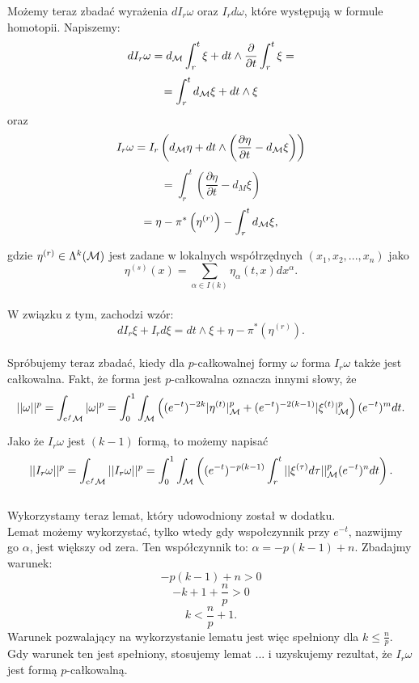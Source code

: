 \documentclass[licencjacka]{pracamgr}
\theoremstyle{definition}
\theoremstyle{definition}
\theoremstyle{plain}
\theoremstyle{plain}
\def\cfm{\ensuremath\mathrm{c}^f\mathcal{M}}
\def\M{\ensuremath\mathcal{M}}
\begin{document}
Możemy teraz zbadać wyrażenia $d I_r \omega$ oraz $I_r d \omega$, które występują
w formule homotopii. Napiszemy:
\[
    d I_r \omega = d_\M \int_r^t \xi + dt \wedge \frac{\partial}{\partial t} \int_r^t \xi =
\]
\[
    = \int_r^t d_\M \xi + dt \wedge \xi
\]
oraz
\[
    I_r \omega = I_r
    \left(
        d_\M \eta + dt \wedge \left( \frac{\partial \eta}{\partial t} - d_\M \xi \right)
    \right)
\]
\[
    = \int_r^t 
        \left(
            \frac{\partial \eta}{\partial t} - d_M \xi
        \right)
\]
\[
    = \eta - \pi^\ast \left( \eta^{(r)} \right) - \int_r^t d_\M \xi,
\]

gdzie $\eta^{(r)} \in \Lambda^k (\M)$ jest zadane w lokalnych współrzędnych
$(x_1, x_2, ..., x_n)$ jako 
\[
    \eta^{(s)}(x) = \sum_{\alpha \in I(k)} \eta_\alpha(t, x) dx^\alpha.
\] \\

W związku z tym, zachodzi wzór:
\[
    d I_r \xi + I_r d \xi = dt \wedge \xi + \eta - \pi^\ast \left( \eta^{(r)} \right).
\] \\

Spróbujemy teraz zbadać, kiedy dla $p$-całkowalnej formy $\omega$ forma $I_r \omega$
także jest całkowalna. Fakt, że forma jest  $p$-całkowalna oznacza innymi słowy, że
\[
    || \omega ||^p = \int_{\cfm} |\omega|^p =
    \int_0^1 \int_{\M} \left(
        (e^{-t})^{-2k} | \eta^{(t)}|^p_{\M} + 
        (e^{-t})^{-2(k-1)} | \xi^{(t)}|^p_{\M} 
    \right)
    (e^{-t})^{m} dt.
\]

Jako że $I_r \omega$ jest $(k-1)$ formą, to możemy napisać
\[
    ||I_r \omega ||^p = 
    \int_{\cfm} ||I_r \omega||^p = 
    \int_0^1 \int_{\M} \left(
        (e^{-t})^{-p(k-1)}
        \int_r^t ||\xi^{(\tau)} d\tau||^p_{\M} (e^{-t})^n dt
    \right).
\] \\

Wykorzystamy teraz lemat, który udowodniony został w dodatku. \\

Lemat możemy wykorzystać, tylko wtedy gdy 
wspołczynnik przy $e^{-t}$, nazwijmy go $\alpha$, jest większy od zera. Ten współczynnik to:
$\alpha = -p(k-1) + n$. Zbadajmy warunek:
\[
    -p(k-1) + n > 0
\]
\[
    -k + 1 + \frac{n}{p} > 0
\]
\[
    k < \frac{n}{p} + 1.
\]
Warunek pozwalający na wykorzystanie lematu jest więc spełniony dla $k \leq \frac{n}{p}$. \\

Gdy warunek ten jest spełniony, stosujemy lemat ... i uzyskujemy rezultat, że $I_r \omega$
jest formą $p$-całkowalną. \\
\end{document}
